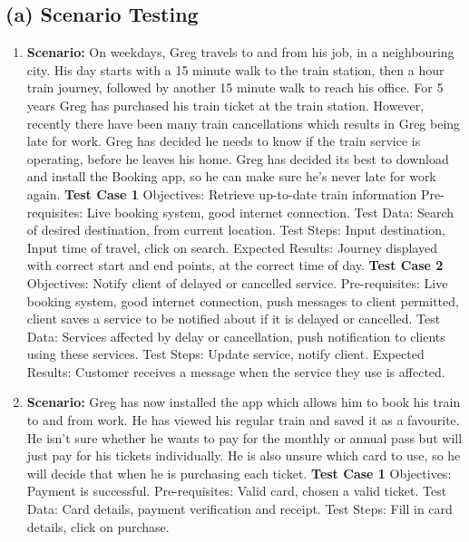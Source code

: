 \documentclass{article}
\begin{document}
\subsection{(a) Scenario Testing}
\begin{enumerate}
	\item \textbf{Scenario:} On weekdays, Greg travels to and from his job, in a neighbouring city. His day starts with a 15 minute walk to the train station, then a hour train journey, followed by another 15 minute walk to reach his office. For 5 years Greg has purchased his train ticket at the train station. However, recently there have been many train cancellations which results in Greg being late for work. Greg has decided he needs to know if the train service is operating, before he leaves his home. Greg has decided its best to download and install the Booking app, so he can make sure he's never late for work again.
		\subitem \textbf{Test Case 1}
		\subitem Objectives: Retrieve up-to-date train information
		\subitem Pre-requisites: Live booking system, good internet connection. 
		\subitem Test Data: Search of desired destination, from current location.
		\subitem Test Steps: Input destination, Input time of travel, click on search.
		\subitem Expected Results: Journey displayed with correct start and end points, at the correct time of day.
		\subitem \textbf{Test Case 2}
		\subitem Objectives: Notify client of delayed or cancelled service.
		\subitem Pre-requisites: Live booking system, good internet connection, push messages to client permitted, client saves a service to be notified about if it is delayed or cancelled. 
		\subitem Test Data: Services affected by delay or cancellation, push notification to clients using these services.
		\subitem Test Steps: Update service, notify client.
		\subitem Expected Results: Customer receives a message when the service they use is affected.
		\newline
	\item \textbf{Scenario:} Greg has now installed the app which allows him to book his train to and from work. He has viewed his regular train and saved it as a favourite. He isn't sure whether he wants to pay for the monthly or annual pass but will just pay for his tickets individually. He is also unsure which card to use, so he will decide that when he is purchasing each ticket.
		\subitem \textbf{Test Case 1}
		\subitem Objectives: Payment is successful.
		\subitem Pre-requisites: Valid card, chosen a valid ticket.
		\subitem Test Data: Card details, payment verification and receipt.
		\subitem Test Steps: Fill in card details, click on purchase.

\end{enumerate}
\end{document}
